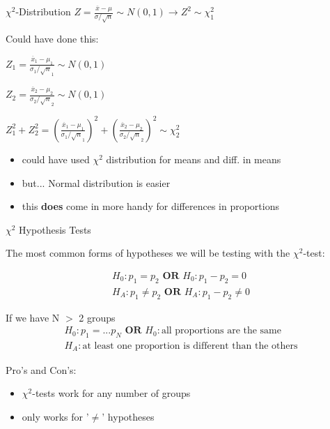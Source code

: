 \documentclass{beamer}
\begin{document}
\begin{frame}{$\chi^2$-Distribution}
$Z = \frac{\overline{x}-\mu}{\sigma / \sqrt{n}} \sim N(0,1) \rightarrow Z^2 \sim \chi^2_{1}$ \hspace{2mm} 
\vspace{8mm}

Could have done this:

$Z_1 = \frac{\overline{x}_1-\mu_1}{\sigma_1 / \sqrt{n}_1} \sim N(0,1)$

$Z_2 = \frac{\overline{x}_2-\mu_2}{\sigma_2 / \sqrt{n}_2} \sim N(0,1)$

$Z_1^2 + Z_2^2 = (\frac{\overline{x}_1-\mu_1}{\sigma_1 / \sqrt{n}_1})^2 + (\frac{\overline{x}_2-\mu_2}{\sigma_2 / \sqrt{n}_2})^2 \sim \chi^2_2$ \vspace{4mm}
\begin{itemize}
    \item could have used $\chi^2$ distribution for means and diff. in means
    \item but... Normal distribution is easier
    \item this \textbf{does} come in more handy for differences in proportions
\end{itemize}
\end{frame}

\begin{frame}{$\chi^2$ Hypothesis Tests}

The most common forms of hypotheses we will be testing with the $\chi^2$-test:

\begin{align*}
    H_0: p_1 = p_2 \textbf{ OR } H_0: p_1 - p_2 = 0\\
    H_A: p_1 \neq p_2 \textbf{ OR } H_A: p_1 - p_2 \neq 0
\end{align*}
\vspace{3mm}

If we have N $>$ 2 groups
\begin{align*}
    H_0: p_1 = ... p_N \textbf{ OR } H_0: \text{all proportions are the same}\\
    H_A: \text{at least one proportion is different than the others}
\end{align*} \vspace{3mm}

Pro's and Con's:
\begin{itemize}
    \item $\chi^2$-tests work for any number of groups
    \item only works for '$\neq$' hypotheses
\end{itemize}
\end{frame}
\end{document}
